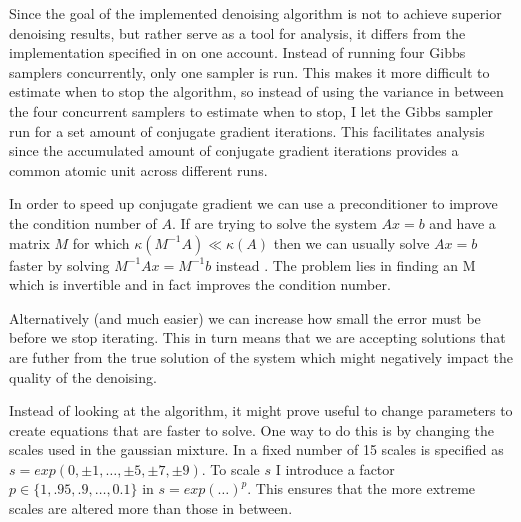 \documentclass{article}
\begin{document}
Since the goal of the implemented denoising algorithm is not to achieve 
superior denoising results, but rather serve as a tool for analysis, it 
differs from the implementation specified in \citep{uwe} on one account.  
Instead of running four Gibbs samplers concurrently, only one sampler is 
run.  This makes it more difficult to estimate when to stop the 
algorithm, so instead of using the variance in between the four 
concurrent samplers to estimate when to stop, I let the Gibbs sampler 
run for a set amount of conjugate gradient iterations. This facilitates 
analysis since the accumulated amount of conjugate gradient iterations 
provides a common atomic unit across different runs.

In order to speed up conjugate gradient we can use a preconditioner to 
improve the condition number of $A$. If are trying to solve the system 
$Ax = b$ and have a matrix $M$ for which $\kappa(M^{-1}A) \ll \kappa(A)$ 
then we can usually solve $Ax = b$ faster by solving $M^{-1}Ax = 
M^{-1}b$ instead \citep{pain}. The problem lies in finding an M which is 
invertible and in fact improves the condition number.

Alternatively (and much easier) we can increase how small the error must 
be before we stop iterating. This in turn means that we are accepting 
solutions that are futher from the true solution of the system which 
might negatively impact the quality of the denoising.

Instead of looking at the algorithm, it might prove useful to change 
parameters to create equations that are faster to solve. One way to do 
this is by changing the scales used in the gaussian mixture. In 
\citep{uwe} a fixed number of 15 scales is specified as $s = exp(0, 
\pm1, \ldots, \pm5, \pm7, \pm9)$. To scale $s$ I introduce a factor $p 
\in \{1, .95, .9, \ldots , 0.1\}$ in $s = exp(\ldots)^p$. This ensures 
that the more extreme scales are altered more than those in between.
%
%
%



\end{document}
